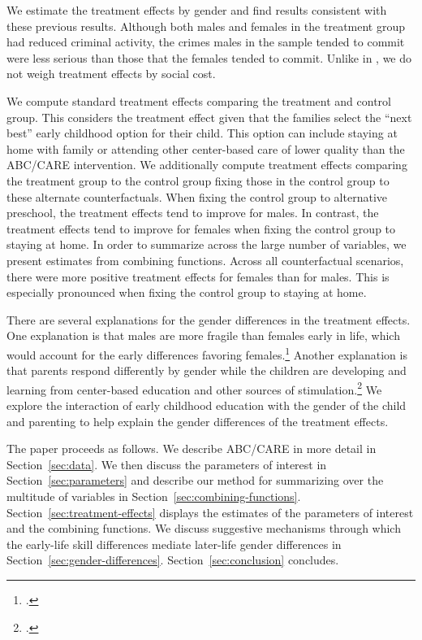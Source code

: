 We estimate the treatment effects by gender and find results consistent with these previous results. Although both males and females in the treatment group had reduced criminal activity, the crimes males in the sample tended to commit were less serious than those that the females tended to commit. Unlike in \citet{Garcia_etal_2016_Comp_CBA_Unpublished}, we do not weigh treatment effects by social cost. 

We compute standard treatment effects comparing the treatment and control group. This considers the treatment effect given that the families select the ``next best'' early childhood option for their child. This option can include staying at home with family or attending other center-based care of lower quality than the ABC/CARE intervention. We additionally compute treatment effects comparing the treatment group to the control group fixing those in the control group to these alternate counterfactuals. When fixing the control group to alternative preschool, the treatment effects tend to improve for males. In contrast, the treatment effects tend to improve for females when fixing the control group to staying at home. In order to summarize across the large number of variables, we present estimates from combining functions. Across all counterfactual scenarios, there were more positive treatment effects for females than for males. This is especially pronounced when fixing the control group to staying at home.

There are several explanations for the gender differences in the treatment effects. One explanation is that males are more fragile than females early in life, which would account for the early differences favoring females.\footnote{\citet{Schore_2017_IMHJ}.} Another explanation is that parents respond differently by gender while the children are developing and learning from center-based education and other sources of stimulation.\footnote{\citet{Baker-Milligan_2013_Boy-Girl-Differences}.} We explore the interaction of early childhood education with the gender of the child and parenting to help explain the gender differences of the treatment effects.

The paper proceeds as follows. We describe ABC/CARE in more detail in Section~\ref{sec:data}. We then discuss the parameters of interest in Section~\ref{sec:parameters} and describe our method for summarizing over the multitude of variables in Section~\ref{sec:combining-functions}. Section~\ref{sec:treatment-effects} displays the estimates of the parameters of interest and the combining functions. We discuss suggestive mechanisms through which the early-life skill differences mediate later-life gender differences in Section~\ref{sec:gender-differences}. Section~\ref{sec:conclusion} concludes.

